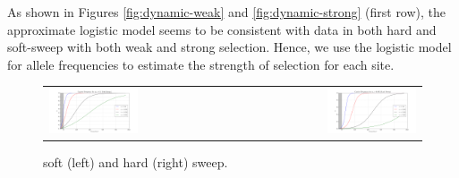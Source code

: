 \documentclass[11pt]{article}
\begin{document}
As shown in Figures \ref{fig:dynamic-weak} and \ref{fig:dynamic-strong} (first 
row), the approximate logistic model seems to be consistent with data in both 
hard and soft-sweep with both weak and strong selection. Hence, we use the 
logistic model for allele frequencies to estimate the strength of selection for each 
site.
\begin{figure}[t]
	\begin{tabular}{lr}
		\centering
		\includegraphics[trim={2in 0.1in 1.5in 
			0in},clip,page=2,width=0.5\textwidth]{sigmoidSoft}
		&\includegraphics[trim={2in 0.1in 1.9in 
			0in},clip,page=2,width=0.5\textwidth]{sigmoidHard}
	\end{tabular}
	\caption{soft (left) and hard (right) sweep.} 	 \label{fig:sweep}
\end{figure}
\end{document}
